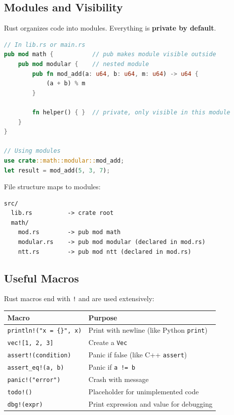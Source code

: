 \documentclass[11pt,a4paper]{article}
\begin{document}
\subsection{Modules and Visibility}

Rust organizes code into modules. Everything is \textbf{private by default}.

\begin{lstlisting}[language=Rust]
// In lib.rs or main.rs
pub mod math {           // pub makes module visible outside
    pub mod modular {    // nested module
        pub fn mod_add(a: u64, b: u64, m: u64) -> u64 {
            (a + b) % m
        }
        
        fn helper() { }  // private, only visible in this module
    }
}

// Using modules
use crate::math::modular::mod_add;
let result = mod_add(5, 3, 7);
\end{lstlisting}

File structure maps to modules:
\begin{verbatim}
src/
  lib.rs          -> crate root
  math/
    mod.rs        -> pub mod math
    modular.rs    -> pub mod modular (declared in mod.rs)
    ntt.rs        -> pub mod ntt (declared in mod.rs)
\end{verbatim}

\subsection{Useful Macros}

Rust macros end with \texttt{!} and are used extensively:

\begin{center}
\begin{tabular}{ll}
\toprule
\textbf{Macro} & \textbf{Purpose} \\
\midrule
\texttt{println!("x = \{\}", x)} & Print with newline (like Python \texttt{print}) \\
\texttt{vec![1, 2, 3]} & Create a \texttt{Vec} \\
\texttt{assert!(condition)} & Panic if false (like C++ \texttt{assert}) \\
\texttt{assert\_eq!(a, b)} & Panic if \texttt{a != b} \\
\texttt{panic!("error")} & Crash with message \\
\texttt{todo!()} & Placeholder for unimplemented code \\
\texttt{dbg!(expr)} & Print expression and value for debugging \\
\bottomrule
\end{tabular}
\end{center}
\end{document}
